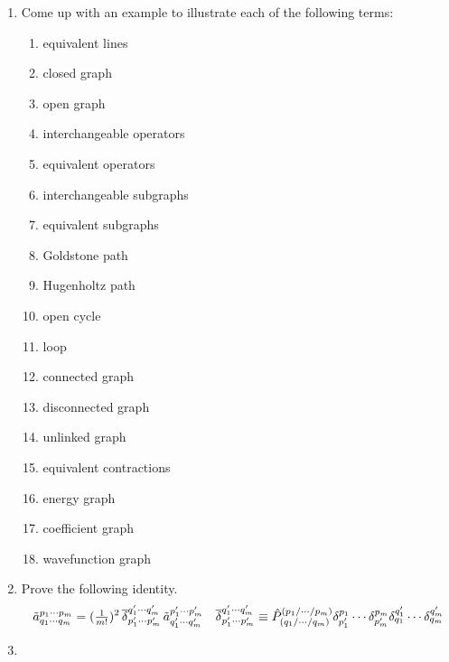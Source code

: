 \documentclass[11pt]{article}
\numberwithin{equation}{section}
\begin{document}
\begin{enumerate}
\item
  Come up with an example to illustrate each of the following terms:
  \begin{multicols}{3}
  \begin{enumerate}
  \item
    equivalent lines
  \item
    closed graph
  \item
    open graph
  \item
    interchangeable operators
  \item
    equivalent operators
  \item
    interchangeable subgraphs
  \item
    equivalent subgraphs
  \item
    Goldstone path
  \item
    Hugenholtz path
  \item
    open cycle
  \item
    loop
  \item
    connected graph
  \item
    disconnected graph
  \item
    unlinked graph
  \item
    equivalent contractions
  \item
    energy graph
  \item
    coefficient graph
  \item
    wavefunction graph
  \end{enumerate}
  \end{multicols}

\item
  Prove the following identity.
\begin{align*}
  \tilde{a}^{p_1\cdots p_m}_{q_1\cdots q_m}
=
  (\tfrac{1}{m!})^2\,
  \overline{\delta }_{p_1'\cdots p_m'}^{q_1'\cdots q_m'}\,
  \tilde{a}^{p_1'\cdots p_m'}_{q_1'\cdots q_m'}
&&
  \overline{\delta }^{q_1'\cdots q_m'}_{p_1'\cdots p_m'}
\equiv
  \hat{P}^{(p_1/\cdots /p_m)}
        _{(q_1/\cdots /q_m)}
  \delta ^{p_1}_{p_1'}\cdots \delta ^{p_m}_{p_m'}
  \delta ^{q_1'}_{q_1}\cdots \delta ^{q_m'}_{q_m}
\end{align*}

\item
  
\end{enumerate}
\end{document}
